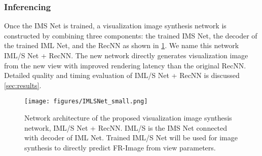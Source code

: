 \subsubsection{Inferencing}\label{section:inferencing}
Once the IMS Net is trained, a visualization image synthesis network is constructed by combining three components: the trained IMS Net, the decoder of the trained IML Net, and the RecNN as shown in \cref{fig:imls_net}. We name this network IML/S Net + RecNN. The new network directly generates visualization image from the new view with improved rendering latency than the original RecNN. Detailed quality and timing evaluation of IML/S Net + RecNN is discussed \cref{sec:results}.

\begin{figure}[t]
    \centering 
    \texttt{[image: figures/IMLSNet\_small.png]}
    \caption{Network architecture of the proposed visualization image synthesis network, IML/S Net + RecNN. IML/S is the IMS Net connected with decoder of IML Net. Trained IML/S Net will be used for image synthesis to directly predict FR-Image from view parameters.}
    \label{fig:imls_net}
\end{figure}



